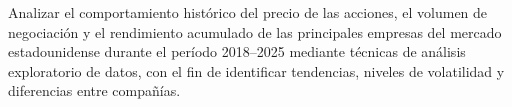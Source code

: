 Analizar el comportamiento histórico del precio de las acciones, el volumen de negociación y el rendimiento acumulado de las principales empresas del mercado estadounidense durante el período 2018–2025 mediante técnicas de análisis exploratorio de datos, con el fin de identificar tendencias, niveles de volatilidad y diferencias entre compañías.